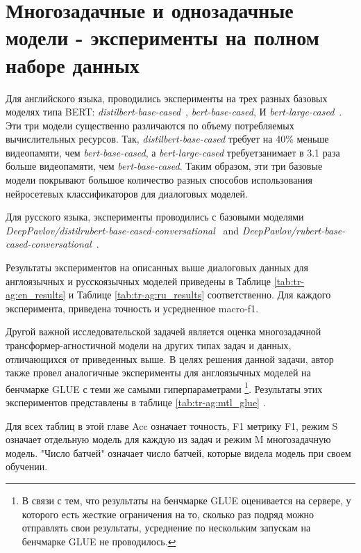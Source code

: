 \section{Многозадачные и однозадачные модели - эксперименты на полном наборе данных} 
Для английского языка, проводились эксперименты на трех разных базовых моделях типа BERT: \textit{distilbert-base-cased}~\cite{distilbert}, \textit{bert-base-cased}, И \textit{bert-large-cased}~\cite{bert}.  Эти три модели существенно различаются по объему потребляемых вычислительных ресурсов. Так, 
\textit{distilbert-base-cased} требует на 40\% меньше видеопамяти, чем \textit{bert-base-cased}, а \textit{bert-large-cased} требуетзанимает в  3.1 раза больше видеопамяти, чем \textit{bert-base-cased}. Таким образом, эти три базовые модели покрывают большое количество разных способов использования нейросетевых классификаторов для диалоговых моделей. 

Для русского языка, эксперименты проводились с базовыми моделями \textit{DeepPavlov/distilrubert-base-cased-conversational}~\cite{distilrubert} and \textit{DeepPavlov/rubert-base-cased-conversational}~\cite{rubert}.

Результаты экспериментов на описанных выше диалоговых данных для англоязычных и русскоязычных моделей приведены в Таблице \ref{tab:tr-ag:en_results} и Таблице \ref{tab:tr-ag:ru_results} соответственно. Для каждого эксперимента, приведена точность и усредненное macro-f1.

Другой важной исследовательской задачей является оценка многозадачной трансформер-агностичной модели на других типах задач и данных, отличающихся от приведенных выше. В целях решения данной задачи, автор также провел аналогичные эксперименты для англоязычных моделей на бенчмарке GLUE\cite{wang_2018} с теми же самыми гиперпараметрами \footnote{В связи с тем, что результаты на бенчмарке GLUE оценивается на сервере, у которого есть жесткие ограничения на то, сколько раз подряд можно отправлять свои результаты, усреднение по нескольким запускам на бенчмарке GLUE не проводилось.}. Результаты этих экспериментов представлены в таблице \ref{tab:tr-ag:mtl_glue} .

Для всех таблиц в этой главе Acc означает точность, F1 метрику F1, режим S означает отдельную модель для каждую из задач и режим M многозадачную модель. "Число батчей" означает число батчей, которые видела модель при своем обучении.

